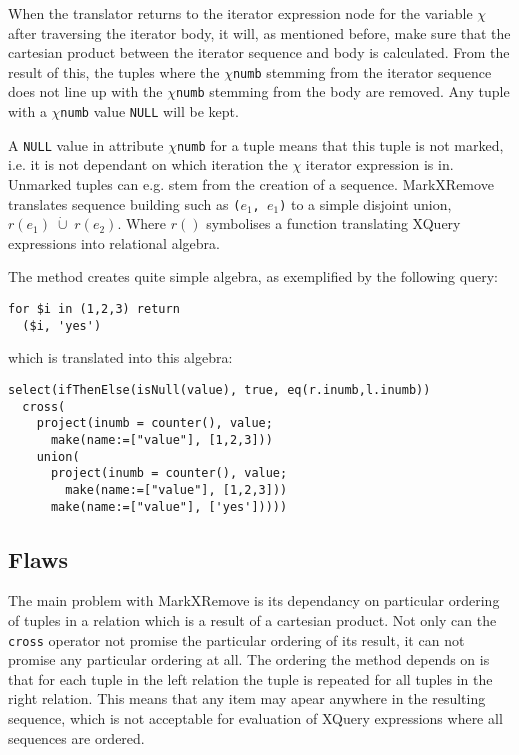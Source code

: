 When the translator returns to the iterator expression node for the variable $\chi$ after traversing the iterator
body, it will, as mentioned before, make sure that the cartesian product between the iterator sequence and body is
calculated. From the result of this, the tuples where the $\chi$\texttt{numb} stemming from the iterator
sequence does not line up with the $\chi$\texttt{numb} stemming from the body are removed. Any tuple with a
$\chi$\texttt{numb} value \texttt{NULL} will be kept.

A \texttt{NULL} value in attribute $\chi$\texttt{numb} for a tuple means that this tuple is not marked, i.e. it is
not dependant on which iteration the $\chi$ iterator expression is in. Unmarked tuples can e.g. stem
from the creation of a sequence. MarkXRemove translates sequence building such as \texttt{(}$e_{1}$\texttt{,
}$e_{1}$\texttt{)} to a simple disjoint union, $r(e_{1})\;\dot\cup\;r(e_{2})$. Where $r()$ symbolises a function
translating XQuery expressions into relational algebra.

The method creates quite simple algebra, as exemplified by the following query:
\begin{Verbatim}
for $i in (1,2,3) return 
  ($i, 'yes')
\end{Verbatim}

which is translated into this algebra:

\begin{Verbatim}
select(ifThenElse(isNull(value), true, eq(r.inumb,l.inumb))
  cross(
    project(inumb = counter(), value;
      make(name:=["value"], [1,2,3]))
    union(
      project(inumb = counter(), value;
        make(name:=["value"], [1,2,3]))
      make(name:=["value"], ['yes']))))
\end{Verbatim} 

\subsection{Flaws}
\label{sect:trans:mxr:flaws}
The main problem with MarkXRemove is its dependancy on particular ordering of tuples in a relation which is a
result of a cartesian product. Not only can the \texttt{cross} operator not promise the particular ordering
of its result, it can not promise any particular ordering at all. The ordering the method depends on is that for
each tuple in the left relation the tuple is repeated for all tuples in the right relation. This means that any
item may apear anywhere in the resulting sequence, which is not acceptable for evaluation of XQuery expressions
where all sequences are ordered.

